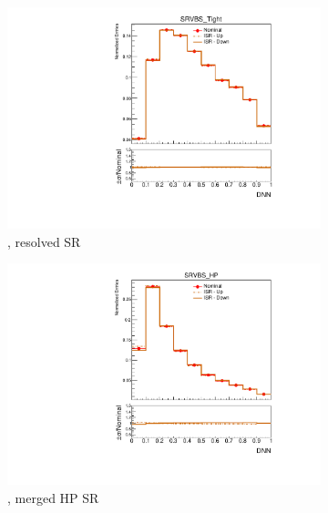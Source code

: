 \begin{figure}[p]
    \centering
    \begin{subfigure}[b]{0.3\textwidth}
        \includegraphics[width=\textwidth]{figures/1lep/PDFUnc/ISR/ttbar_0ptag2pjet_0ptv_SRVBS_Tight_DNN_SysTheoryISR_ttbar__1up_Norm.pdf}
        \caption{\ttbar, resolved SR}
    \end{subfigure}
    \begin{subfigure}[b]{0.3\textwidth}
        \includegraphics[width=\textwidth]{figures/1lep/PDFUnc/ISR/ttbar_0ptag1pfat0pjet_0ptv_SRVBS_HP_DNN_SysTheoryISR_ttbar__1up_Norm.pdf}
        \caption{\ttbar, merged HP SR}
    \end{subfigure}
    \begin{subfigure}[b]{0.3\textwidth}

\end{subfigure}
\end{figure}
